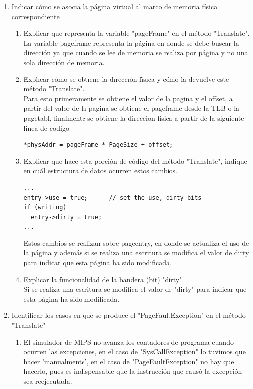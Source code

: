 \documentclass[11pt]{article}
\begin{document}
\begin{enumerate}
\begin{enumerate}
\begin{enumerate}
            \end{enumerate}
          \end{enumerate}
          \item  Indicar cómo se asocia la página virtual al marco de memoria física correspondiente\\
          \begin{enumerate}
            \item Explicar que representa la variable "pageFrame" en el método "Translate".\\
           La variable pageframe representa la página en donde se debe buscar la dirección ya que cuando se lee de memoria se realiza por página y no una sola dirección de memoria.
            
            \item Explicar cómo se obtiene la dirección física y cómo la devuelve este método "Translate".\\
            Para esto primeramente se obtiene el valor de la pagina y el offset, a partir del valor de
la pagina se obtiene el pageframe desde la TLB o la pagetabl, finalmente se obtiene la
direccion fisica a partir de la siguiente linea de codigo
             \begin{lstlisting}
*physAddr = pageFrame * PageSize + offset;
        \end{lstlisting}  
            \item Explicar que hace esta porción de código del método "Translate", indique en cuál estructura de datos ocurren estos cambios.\\
            \begin{lstlisting}
...
entry->use = true;		// set the use, dirty bits
if (writing)
  entry->dirty = true;
...
            \end{lstlisting}
            Estos cambios se realizan sobre pageentry, en donde se actualiza el uso de la página y además si se realiza una escritura se modifica el valor de dirty para indicar que esta página ha sido modificada.
            
            \item Explicar la funcionalidad de la bandera (bit) "dirty".\\
              Si se realiza una escritura se modifica el valor de "dirty" para indicar que esta página ha sido modificada.
            \end{enumerate}
          \item  Identificar los casos en que se produce el "PageFaultException" en el método "Translate"
          \begin{enumerate}
            \item  El simulador de MIPS no avanza los contadores de programa cuando ocurren las excepciones, en el caso de "SysCallException" lo tuvimos que hacer 'manualmente', en el caso de "PageFaultException" no hay que hacerlo, pues es indispensable que la instrucción que causó la excepción sea reejecutada.\\
            

\end{enumerate}
\end{enumerate}
\end{document}
